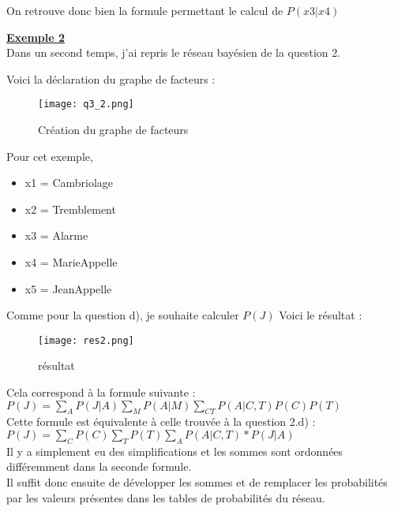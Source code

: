 \documentclass[12pt]{article}
\begin{document}
On retrouve donc bien la formule permettant le calcul de $P(x3|x4)$

\textbf{\underline{Exemple 2}}
\\
Dans un second temps, j'ai repris le réseau bayésien de la question 2.

Voici la déclaration du graphe de facteurs :
\\
\begin{figure}[H]
\begin{center}
	\texttt{[image: q3\_2.png]}
	\caption{Création du graphe de facteurs}
	\label{fig:Exemple}
\end{center}
\end{figure}

Pour cet exemple, 
\begin{itemize}
\item x1 = Cambriolage
\item x2 = Tremblement
\item x3 = Alarme
\item x4 = MarieAppelle
\item x5 = JeanAppelle
\end{itemize}
Comme pour la question d), je souhaite calculer $P(J)$
Voici le résultat : 
\begin{figure}[H]
\begin{center}
	\texttt{[image: res2.png]}
	\caption{résultat}
\end{center}
\end{figure}
Cela correspond à la formule suivante : \\ 
$P(J) = \sum_{A} P(J|A) \sum_{M} P(A|M) \sum_{C T} P(A|C, T) P(C) P(T) $ \\
Cette formule est équivalente à celle trouvée à la question 2.d) : \\
$P(J) = \sum_{C} P(C) \sum_{T} P(T) \sum_{A} P(A|C,T)*P(J|A)$
\\ \linebreak
Il y a simplement eu des simplifications et les sommes sont ordonnées différemment dans la seconde formule. \\
Il suffit donc ensuite de développer les sommes et de remplacer les probabilités par les valeurs présentes dans les tables de probabilités du réseau.
\end{document}
